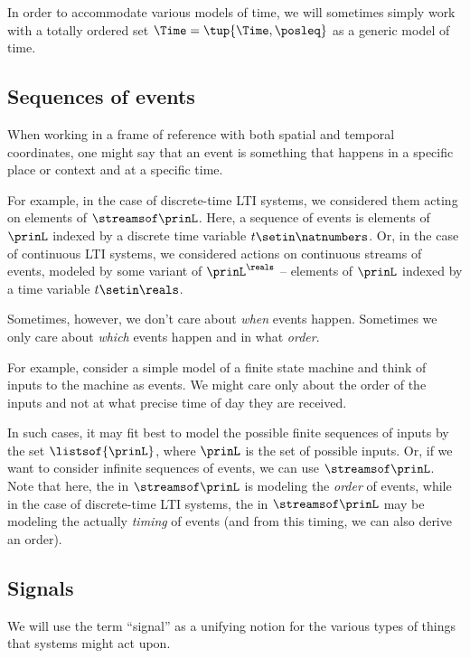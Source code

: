 In order to accommodate various models of time, we will sometimes simply work with a totally ordered set $\Time = \tup{\Time, \posleq}$ as a generic model of time.

\subsection{Sequences of events}

When working in a frame of reference with both spatial and temporal coordinates, one might say that an event is something that happens in a specific place or context and at a specific time.

For example, in the case of discrete-time LTI systems, we considered them acting on elements of $\streamsof\prinL$.
Here, a sequence of events is elements of $\prinL$ indexed by a discrete time variable $t \setin \natnumbers$.
Or, in the case of continuous LTI systems, we considered actions on continuous streams of events, modeled by some variant of $\prinL^\reals$ -- elements of $\prinL$ indexed by a time variable $t \setin \reals$.

Sometimes, however, we don't care about \emph{when} events happen.
Sometimes we only care about  \emph{which} events happen and in what \emph{order}.

For example, consider a simple model of a finite state machine and think of inputs to the machine as events.
We might care only about the order of the inputs and not at what precise time of day they are received.

In such cases, it may fit best to model the possible finite sequences of inputs by the set $\listsof{\prinL}$, where $\prinL$ is the set of possible inputs.
Or, if we want to consider infinite sequences of events, we can use $\streamsof\prinL$.
Note that here, the \natnumbers  in $\streamsof\prinL$ is modeling the \emph{order} of events, while in the case of discrete-time LTI systems, the \natnumbers  in $\streamsof\prinL$ may be modeling the actually \emph{timing} of events (and from this timing, we can also derive an order).

\subsection{Signals}

We will use the term ``signal'' as a unifying notion for the various types of things that systems might act upon.

